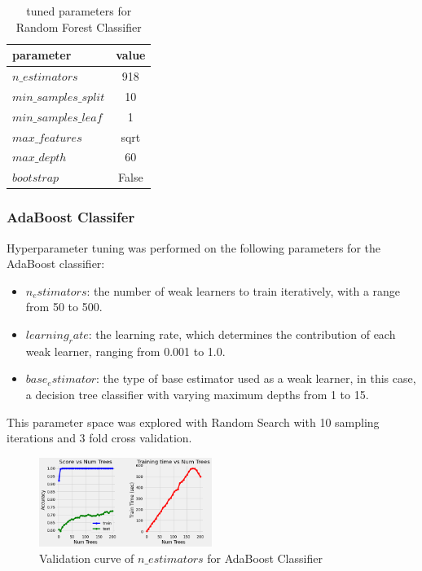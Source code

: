 \documentclass{article}
\begin{document}
\begin{table}[ht]
\centering
\caption{tuned parameters for Random Forest Classifier}
\begin{tabular}{l|c}
\toprule
parameter & value \\
\midrule
$n\_estimators$ & 918 \\
$min\_samples\_split$ & 10 \\
$min\_samples\_leaf$ & 1 \\
$max\_features$ & sqrt \\
$max\_depth$ & 60 \\
$bootstrap$ & False \\
\bottomrule
\end{tabular}
\end{table}

\subsubsection{AdaBoost Classifer}

Hyperparameter tuning was performed on the following parameters for the AdaBoost classifier:
\begin{itemize}
\item $n_estimators$: the number of weak learners to train iteratively, with a range from 50 to 500.
\item $learning_rate$: the learning rate, which determines the contribution of each weak learner, ranging from 0.001 to 1.0.
\item $base_estimator$: the type of base estimator used as a weak learner, in this case, a decision tree classifier with varying maximum depths from 1 to 15.
\end{itemize}

This parameter space was explored with Random Search with 10 sampling iterations and 3 fold cross validation.

\begin{figure}[h]
  \centering
  \includegraphics[width=0.5\textwidth]{adaboost_num_trees.png}
  \caption{Validation curve of $n\_estimators$ for AdaBoost Classifier}
  \end{figure}
\end{document}
